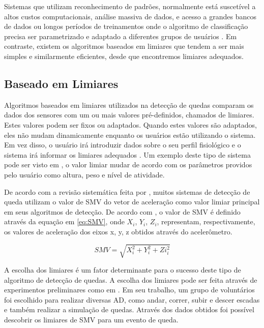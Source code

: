 Sistemas que utilizam reconhecimento de padrões, normalmente está suscetível a altos custos computacionais, análise massiva de dados, e acesso a grandes bancos de dados ou longos períodos de treinamentos onde o algoritmo de classificação precisa ser parametrizado e adaptado a diferentes grupos de usuários \citep{casilari2015analysis}. Em contraste, existem os algoritmos baseados em limiares que tendem a ser mais simples e similarmente eficientes, desde que encontremos limiares adequados.

\subsection{Baseado em Limiares}
Algoritmos baseados em limiares utilizados na detecção de quedas comparam os dados dos sensores com um ou mais valores pré-definidos, chamados de limiares. Estes valores podem ser fixos ou adaptados. Quando estes valores são adaptados, eles não mudam dinamicamente enquanto os usuários estão utilizando o sistema. Em vez disso, o usuário irá introduzir dados sobre o seu perfil fisiológico e o sistema irá informar os limiares adequados \citep{habib2014smartphone}. Um exemplo deste tipo de sistema pode ser visto em \cite{sposaro2009ifall}, o valor limiar mudar de acordo com os parâmetros providos pelo usuário como altura, peso e nível de atividade.

De acordo com a revisão sistemática feita por \cite{casilari2015analysis}, muitos sistemas de detecção de queda utilizam o valor de \ac{SMV} do vetor de aceleração como  valor limiar principal em seus algoritmos de detecção. De acordo com \cite{casilari2015analysis}, o valor de \ac{SMV} é definido através da equação em \ref{eq:SMV}, onde $X_i$, $Y_i$, $Z_i$, representam, respectivamente, os valores de aceleração dos eixos x, y, z obtidos através do acelerômetro.

\begin{equation}
SMV = \sqrt{X_i^2 + Y_i^2 + Zi_i^2} 
\label{eq:SMV}
\end{equation}

A escolha dos limiares é um fator determinante para o sucesso deste tipo de algoritmo de detecção de quedas. A escolha dos limiares pode ser feita através de experimentos preliminares como em \cite{zhang2013honey}. Em seu trabalho, um grupo de voluntários foi escolhido para realizar diversas \ac{AD}, como andar, correr, subir e descer escadas e também realizar a simulação de quedas. Através dos dados obtidos foi possível descobrir os limiares de \ac{SMV} para um evento de queda.  

